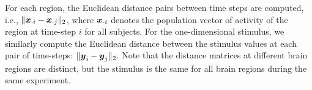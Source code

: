 \documentclass[11pt]{extarticle}
\begin{document}
For each region, the Euclidean distance pairs between time steps are computed, i.e., $\|\boldsymbol{x}_{\cdot i}-\boldsymbol{x}_{\cdot j}\|_2$,  where $\boldsymbol{x}_{\cdot i}$ denotes the population vector of activity of the region at time-step $i$ for all subjects.
For the one-dimensional stimulus, we similarly compute the Euclidean distance between the stimulus values at each pair of time-steps: $\|\boldsymbol{y}_i - \boldsymbol{y}_j\|_2$.
Note that the distance matrices at different brain regions are distinct, but the stimulus is the same for all brain regions during the same experiment.
\end{document}
